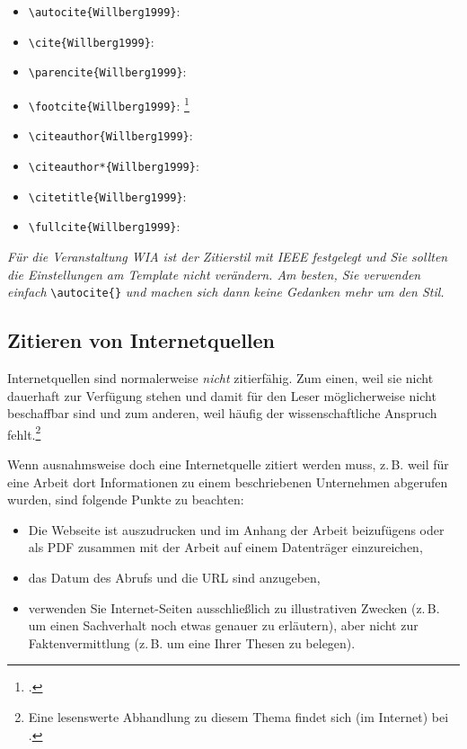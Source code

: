 \documentclass[conference,compsoc,final,a4paper]{IEEEtran}
\begin{document}
\begin{itemize}
	\item \lstinline+\autocite{Willberg1999}+: \autocite{Willberg1999}
	\item \lstinline+\cite{Willberg1999}+: \cite{Willberg1999}
	\item \lstinline+\parencite{Willberg1999}+: \parencite{Willberg1999}
	\item \lstinline+\footcite{Willberg1999}+: \footcite{Willberg1999}
	\item \lstinline+\citeauthor{Willberg1999}+: \citeauthor{Willberg1999}
	\item \lstinline+\citeauthor*{Willberg1999}+: \citeauthor*{Willberg1999}
	\item \lstinline++: \citetitle{Willberg1999}
	\item \lstinline++: \fullcite{Willberg1999}
\end{itemize}

\textit{Für die Veranstaltung WIA ist der Zitierstil mit IEEE festgelegt und Sie sollten die Einstellungen am Template nicht verändern. Am besten, Sie verwenden einfach}  \lstinline+\autocite{}+ \textit{und machen sich dann keine Gedanken mehr um den Stil.}

\subsection{Zitieren von Internetquellen}
Internetquellen sind normalerweise \textit{nicht} zitierfähig. Zum einen, weil sie nicht dauerhaft zur Verfügung stehen und damit für den Leser möglicherweise nicht beschaffbar sind und zum anderen, weil häufig der wissenschaftliche Anspruch fehlt.\footnote{Eine lesenswerte Abhandlung zu diesem Thema findet sich (im Internet) bei \autocite{Weber2006}.}

Wenn ausnahmsweise doch eine Internetquelle zitiert werden muss, z.\,B. weil für eine Arbeit dort Informationen zu einem beschriebenen Unternehmen abgerufen wurden, sind folgende Punkte zu beachten:

\begin{itemize}
\item Die Webseite ist auszudrucken und im Anhang der Arbeit beizufügens oder als PDF zusammen mit der Arbeit auf einem Datenträger einzureichen,
\item das Datum des Abrufs und die URL sind anzugeben,
\item verwenden Sie Internet-Seiten ausschließlich zu illustrativen Zwecken (z.\,B. um einen Sachverhalt noch etwas genauer zu erläutern), aber nicht zur Faktenvermittlung (z.\,B. um eine Ihrer Thesen zu belegen).
\end{itemize}
\end{document}

